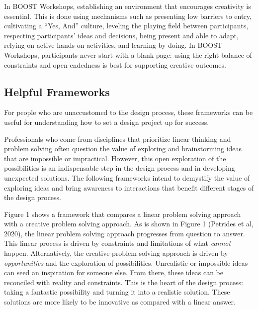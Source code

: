 \documentclass[11.5pt]{sig-alternate} %
\begin{document}
\begin{large}
In BOOST Workshops, establishing an environment that encourages creativity is essential. This is done using mechanisms such as presenting low barriers to entry, cultivating a “Yes, And” culture, leveling the playing field between participants, respecting participants’ ideas and decisions, being present and able to adapt, relying on active hands-on activities, and learning by doing. In BOOST Workshops, participants never start with a blank page: using the right balance of constraints and open-endedness is best for supporting creative outcomes. 

\subsection*{Helpful Frameworks}

For people who are unaccustomed to the design process, these frameworks can be useful for understanding how to set a design project up for success. 

Professionals who come from disciplines that prioritize linear thinking and problem solving often question the value of exploring and brainstorming ideas that are impossible or impractical. However, this open exploration of the possibilities is an indispensable step in the design process and in developing unexpected solutions. The following frameworks intend to demystify the value of exploring ideas and bring awareness to interactions that benefit different stages of the design process.  

Figure 1 shows a framework that compares a linear problem solving approach with a creative problem solving approach. As is shown in Figure 1 (Petrides et al, 2020), the linear problem solving approach progresses from question to answer. This linear process is driven by constraints and limitations of what \textit{cannot} happen. Alternatively, the creative problem solving approach is driven by \textit{opportunities} and the exploration of possibilities. Unrealistic or impossible ideas can seed an inspiration for someone else. From there, these ideas can be reconciled with reality and constraints. This is the heart of the design process: taking a fantastic possibility and turning it into a realistic solution. These solutions are more likely to be innovative as compared with a linear answer.


\end{large}
\end{document}
